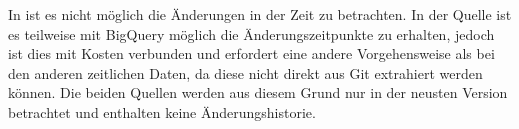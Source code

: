 In  ist es nicht möglich die Änderungen in der Zeit zu betrachten.
In der  Quelle ist es teilweise mit BigQuery möglich die Änderungszeitpunkte zu erhalten, jedoch ist dies mit Kosten verbunden und erfordert eine andere Vorgehensweise als bei den anderen zeitlichen Daten, da diese nicht direkt aus Git extrahiert werden können.
Die beiden Quellen werden aus diesem Grund nur in der neusten Version betrachtet und enthalten keine Änderungshistorie.







